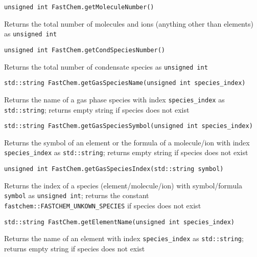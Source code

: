 \documentclass[numbers=noenddot]{aux/fcmanual}
\begin{document}
\lstinline!unsigned int FastChem.getMoleculeNumber()!
\begin{addmargin}[25pt]{0pt}
  Returns the total number of molecules and ions (anything other than elements) as \lstinline!unsigned int!
\end{addmargin}

\bigbreak

\lstinline!unsigned int FastChem.getCondSpeciesNumber()!
\begin{addmargin}[25pt]{0pt}
	Returns the total number of condensate species as \lstinline!unsigned int!
\end{addmargin}

\bigbreak

\lstinline!std::string FastChem.getGasSpeciesName(unsigned int species_index)!
\begin{addmargin}[25pt]{0pt}
  Returns the name of a gas phase species with index \lstinline!species_index! as \lstinline!std::string!; returns empty string if species does not exist
\end{addmargin}  

\bigbreak

\lstinline!std::string FastChem.getGasSpeciesSymbol(unsigned int species_index)!
\begin{addmargin}[25pt]{0pt}
  Returns the symbol of an element or the formula of a molecule/ion with index \lstinline!species_index! as \lstinline!std::string!; returns empty string if species does not exist
\end{addmargin}

\bigbreak

\lstinline!unsigned int FastChem.getGasSpeciesIndex(std::string symbol)!
\begin{addmargin}[25pt]{0pt}
  Returns the index of a species (element/molecule/ion) with symbol/formula \lstinline!symbol! as \lstinline!unsigned int!; returns the constant \lstinline!fastchem::FASTCHEM_UNKOWN_SPECIES! if species does not exist
\end{addmargin}



\bigbreak

\lstinline!std::string FastChem.getElementName(unsigned int species_index)!
\begin{addmargin}[25pt]{0pt}
	Returns the name of an element with index \lstinline!species_index! as \lstinline!std::string!; returns empty string if species does not exist
\end{addmargin}  

\bigbreak
\end{document}
